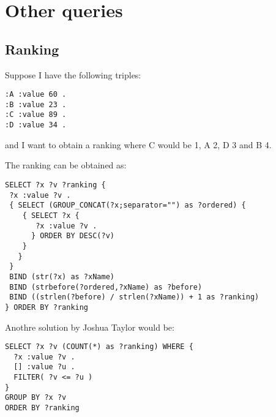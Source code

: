 \section{Other queries}

\subsection{Ranking}
Suppose I have the following triples:

\begin{lstlisting}[style=SPARQL]
:A :value 60 .
:B :value 23 .
:C :value 89 .
:D :value 34 .
\end{lstlisting}

and I want to obtain a ranking where C would be 1, A 2, D 3 and B 4.

The ranking can be obtained as:

\begin{lstlisting}[style=SPARQL]
SELECT ?x ?v ?ranking { 
 ?x :value ?v .
 { SELECT (GROUP_CONCAT(?x;separator="") as ?ordered) {
    { SELECT ?x {
       ?x :value ?v .
      } ORDER BY DESC(?v)
    }
   }
 }
 BIND (str(?x) as ?xName)
 BIND (strbefore(?ordered,?xName) as ?before) 
 BIND ((strlen(?before) / strlen(?xName)) + 1 as ?ranking)
} ORDER BY ?ranking
\end{lstlisting}

Anothre solution by Joshua Taylor would be:

\begin{lstlisting}[style=SPARQL]
SELECT ?x ?v (COUNT(*) as ?ranking) WHERE {
  ?x :value ?v .
  [] :value ?u .
  FILTER( ?v <= ?u )
}
GROUP BY ?x ?v
ORDER BY ?ranking
\end{lstlisting}
